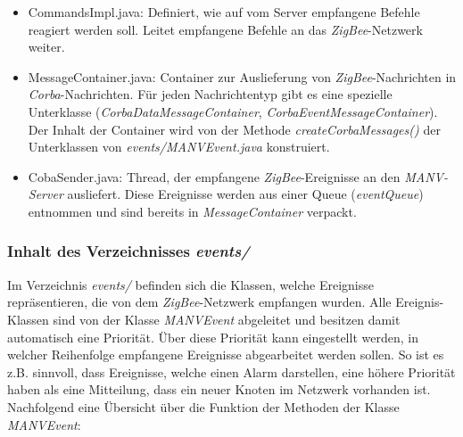     \begin{itemize}
        \item{CommandsImpl.java:} Definiert, wie auf vom Server empfangene Befehle reagiert werden soll.
                                  Leitet empfangene Befehle an das \emph{ZigBee}-Netzwerk weiter.
        \item{MessageContainer.java:} Container zur Auslieferung von \emph{ZigBee}-Nachrichten in \emph{Corba}-Nachrichten.
                                      Für jeden Nachrichtentyp gibt es eine spezielle Unterklasse 
                                      (\emph{CorbaDataMessageContainer},
                                      \emph{CorbaEventMessageContainer}). Der Inhalt der Container wird von der Methode 
                                      \emph{createCorbaMessages()} der Unterklassen von \emph{events/MANVEvent.java}
                                      konstruiert.
        \item{CobaSender.java:} Thread, der empfangene \emph{ZigBee}-Ereignisse an den \emph{MANV-Server} ausliefert.
                                Diese Ereignisse werden aus einer Queue (\emph{eventQueue}) entnommen und sind
                                bereits in \emph{MessageContainer} verpackt.
    \end{itemize}

    \subsubsection{Inhalt des Verzeichnisses \emph{events/}}
    
    Im Verzeichnis \emph{events/} befinden sich die Klassen, welche Ereignisse repräsentieren, die von dem 
    \emph{ZigBee}-Netzwerk empfangen wurden. Alle Ereignis-Klassen sind von der Klasse \emph{MANVEvent} abgeleitet 
    und besitzen damit automatisch eine Priorität. Über diese Priorität kann eingestellt werden, in welcher Reihenfolge 
    empfangene Ereignisse abgearbeitet werden sollen. So ist es z.B. sinnvoll, dass Ereignisse, welche einen Alarm 
    darstellen, eine höhere Priorität haben als eine Mitteilung, dass ein neuer Knoten im Netzwerk vorhanden ist. 
    Nachfolgend eine Übersicht über die Funktion der Methoden der Klasse \emph{MANVEvent}:

